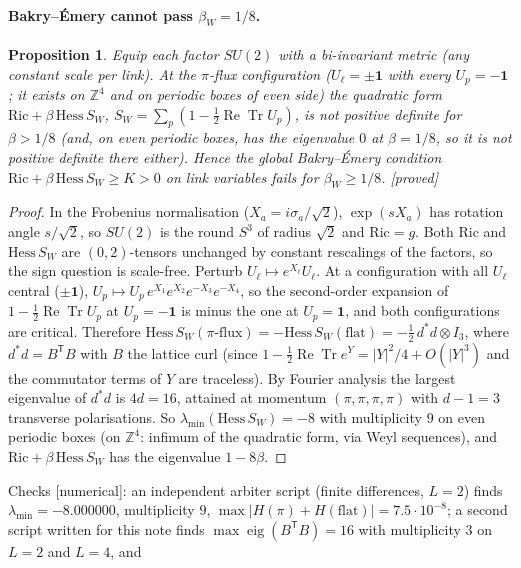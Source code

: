 \documentclass[11pt,a4paper]{article}
\newtheorem{proposition}[theorem]{Proposition}
\theoremstyle{remark}
\theoremstyle{definition}
\theoremstyle{plain}
\theoremstyle{remark}
\newcommand{\Z}{\mathbb{Z}}
\newcommand{\ReTr}{\operatorname{Re}\operatorname{Tr}}
\newcommand{\st}[1]{\textsf{[#1]}}
\begin{document}
\paragraph{Bakry--\'Emery cannot pass $\beta_W=1/8$.}
\begin{proposition}\label{prop:piflux}
Equip each factor $SU(2)$ with a bi-invariant metric (any constant scale per link). At the $\pi$-flux
configuration ($U_\ell=\pm\mathbf 1$ with every $U_p=-\mathbf 1$; it exists on $\Z^4$ and on periodic boxes of
even side) the quadratic form $\mathrm{Ric}+\beta\,\mathrm{Hess}\,S_W$, $S_W=\sum_p(1-\frac12\ReTr U_p)$, is not
positive definite for $\beta>1/8$ (and, on even periodic boxes, has the eigenvalue $0$ at $\beta=1/8$, so it
is not positive definite there either). Hence the global Bakry--\'Emery
condition $\mathrm{Ric}+\beta\,\mathrm{Hess}\,S_W\ge K>0$ on link variables fails for $\beta_W\ge1/8$. \st{proved}
\end{proposition}
\begin{proof}
In the Frobenius normalisation ($X_a=i\sigma_a/\sqrt2$), $\exp(sX_a)$ has rotation angle $s/\sqrt2$, so
$SU(2)$ is the round $S^3$ of radius $\sqrt2$ and $\mathrm{Ric}=g$. Both $\mathrm{Ric}$ and $\mathrm{Hess}\,S_W$ are
$(0,2)$-tensors unchanged by constant rescalings of the factors, so the sign question is scale-free.
Perturb $U_\ell\mapsto e^{X_\ell}U_\ell$. At a configuration with all $U_\ell$ central ($\pm\mathbf 1$),
$U_p\mapsto U_p\,e^{X_1}e^{X_2}e^{-X_3}e^{-X_4}$, so the second-order expansion of $1-\frac12\ReTr U_p$ at
$U_p=-\mathbf 1$ is minus the one at $U_p=\mathbf 1$, and both configurations are critical. Therefore
$\mathrm{Hess}\,S_W(\pi\text{-flux})=-\mathrm{Hess}\,S_W(\text{flat})=-\frac12\,d^*d\otimes I_3$, where $d^*d=B^{\mathsf T}B$
with $B$ the lattice curl (since $1-\frac12\ReTr e^{Y}=|Y|^2/4+O(|Y|^3)$ and the commutator terms of $Y$ are
traceless). By Fourier analysis the largest eigenvalue of $d^*d$ is $4d=16$, attained at momentum
$(\pi,\pi,\pi,\pi)$ with $d-1=3$ transverse polarisations. So $\lambda_{\min}(\mathrm{Hess}\,S_W)=-8$ with
multiplicity $9$ on even periodic boxes (on $\Z^4$: infimum of the quadratic form, via Weyl sequences), and
$\mathrm{Ric}+\beta\,\mathrm{Hess}\,S_W$ has the eigenvalue $1-8\beta$.
\end{proof}
Checks \st{numerical}: an independent arbiter script (finite differences, $L=2$) finds
$\lambda_{\min}=-8.000000$, multiplicity $9$, $\max|H(\pi)+H(\text{flat})|=7.5\cdot10^{-8}$; a second script
written for this note finds $\max\operatorname{eig}(B^{\mathsf T}B)=16$ with multiplicity $3$ on $L=2$ and $L=4$, and
\end{document}
